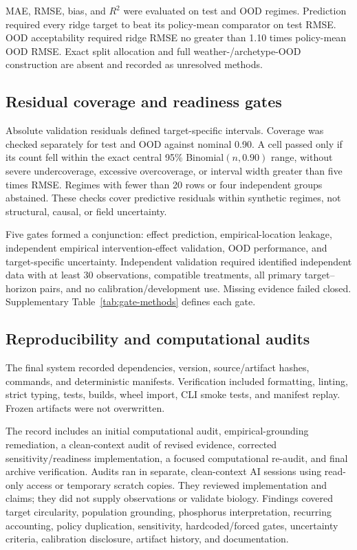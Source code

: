 \documentclass[11pt]{article}
\begin{document}
MAE, RMSE, bias, and $R^2$ were evaluated on test and OOD regimes. Prediction required every ridge target to beat its policy-mean comparator on test RMSE. OOD acceptability required ridge RMSE no greater than 1.10 times policy-mean OOD RMSE. Exact split allocation and full weather-/archetype-OOD construction are absent and recorded as unresolved methods.

\subsection{Residual coverage and readiness gates}

Absolute validation residuals defined target-specific intervals. Coverage was checked separately for test and OOD against nominal 0.90. A cell passed only if its count fell within the exact central 95\% Binomial$(n,0.90)$ range, without severe undercoverage, excessive overcoverage, or interval width greater than five times RMSE. Regimes with fewer than 20 rows or four independent groups abstained. These checks cover predictive residuals within synthetic regimes, not structural, causal, or field uncertainty.

Five gates formed a conjunction: effect prediction, empirical-location leakage, independent empirical intervention-effect validation, OOD performance, and target-specific uncertainty. Independent validation required identified independent data with at least 30 observations, compatible treatments, all primary target--horizon pairs, and no calibration/development use. Missing evidence failed closed. Supplementary Table~\ref{tab:gate-methods} defines each gate.

\subsection{Reproducibility and computational audits}

The final system recorded dependencies, version, source/artifact hashes, commands, and deterministic manifests. Verification included formatting, linting, strict typing, tests, builds, wheel import, CLI smoke tests, and manifest replay. Frozen artifacts were not overwritten.

The record includes an initial computational audit, empirical-grounding remediation, a clean-context audit of revised evidence, corrected sensitivity/readiness implementation, a focused computational re-audit, and final archive verification. Audits ran in separate, clean-context AI sessions using read-only access or temporary scratch copies. They reviewed implementation and claims; they did not supply observations or validate biology. Findings covered target circularity, population grounding, phosphorus interpretation, recurring accounting, policy duplication, sensitivity, hardcoded/forced gates, uncertainty criteria, calibration disclosure, artifact history, and documentation.
\end{document}
